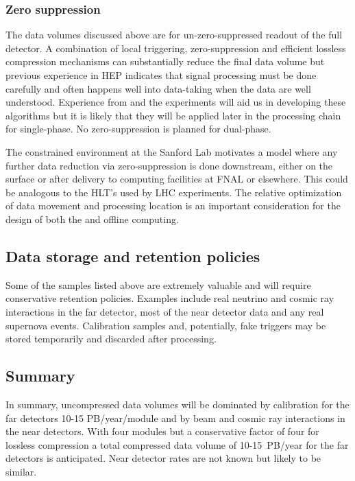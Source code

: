 \subsubsection{Zero suppression}

The data volumes discussed above are for un-zero-suppressed readout of the full detector. A combination of local triggering, zero-suppression and  efficient lossless compression mechanisms can substantially reduce the final data volume but previous experience in HEP indicates that signal processing must be done carefully and often happens well into data-taking when the data are well understood.  Experience from   and the  experiments will aid us in developing these algorithms but it is likely that they will be applied later in the processing chain for single-phase.  No zero-suppression is planned for dual-phase.

The constrained environment at the Sanford Lab motivates a model where any further data reduction via zero-suppression is done downstream, either on the surface or after delivery to computing facilities at FNAL or elsewhere. This could be analogous to the HLT's used by LHC experiments. The relative optimization of data movement and processing location is an important consideration for the design of both the  and offline computing.

\subsection{Data storage and retention policies}
Some of the samples listed above are extremely valuable and will require conservative retention policies.  Examples include real neutrino and cosmic ray interactions in the far detector, most of the near detector data and any real supernova events. Calibration samples and, potentially, fake  triggers may be stored temporarily and discarded after processing. 

\subsection{Summary}
In summary, uncompressed data volumes will be dominated by calibration for the far detectors 10-15 PB/year/module and by beam and cosmic ray interactions in the near detectors.  With four  modules but a conservative factor of four for lossless compression a total compressed data volume of 10-15~PB/year for the far detectors is anticipated. Near detector rates are not known but likely to be similar.


